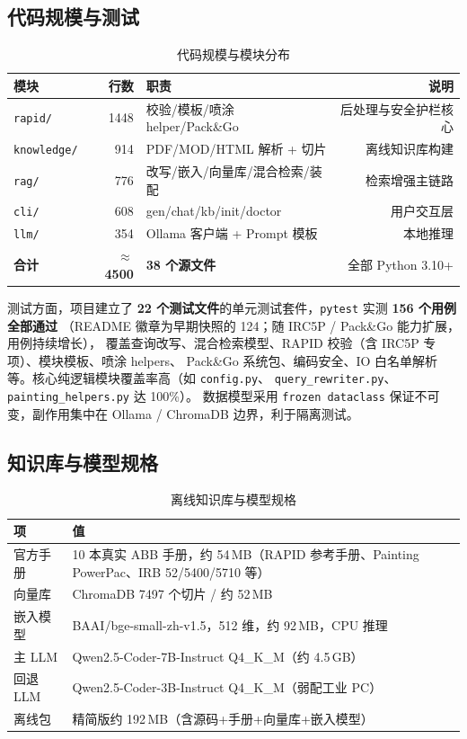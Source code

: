 \documentclass[12pt,a4paper,fontset=none]{ctexart}
\begin{document}
\subsection{代码规模与测试}
\begin{table}[h]
\centering
\caption{代码规模与模块分布}
\small
\begin{tabular}{@{}l r l r@{}}
\toprule
\textbf{模块} & \textbf{行数} & \textbf{职责} & \textbf{说明} \\
\midrule
\texttt{rapid/}     & 1448 & 校验/模板/喷涂 helper/Pack\&Go & 后处理与安全护栏核心 \\
\texttt{knowledge/} & 914  & PDF/MOD/HTML 解析 + 切片 & 离线知识库构建 \\
\texttt{rag/}       & 776  & 改写/嵌入/向量库/混合检索/装配 & 检索增强主链路 \\
\texttt{cli/}       & 608  & gen/chat/kb/init/doctor & 用户交互层 \\
\texttt{llm/}       & 354  & Ollama 客户端 + Prompt 模板 & 本地推理 \\
\midrule
\textbf{合计} & \textbf{$\approx$4500} & \textbf{38 个源文件} & 全部 Python 3.10+ \\
\bottomrule
\end{tabular}
\end{table}

测试方面，项目建立了 \textbf{22 个测试文件}的单元测试套件，\texttt{pytest} 实测 \textbf{156 个用例全部通过}
（README 徽章为早期快照的 124；随 IRC5P / Pack\&Go 能力扩展，用例持续增长），
覆盖查询改写、混合检索模型、RAPID 校验（含 IRC5P 专项）、模块模板、喷涂 helpers、
Pack\&Go 系统包、编码安全、IO 白名单解析等。核心纯逻辑模块覆盖率高（如 \texttt{config.py}、
\texttt{query\_rewriter.py}、\texttt{painting\_helpers.py} 达 100\%）。
数据模型采用 \texttt{frozen dataclass} 保证不可变，副作用集中在
Ollama / ChromaDB 边界，利于隔离测试。

\subsection{知识库与模型规格}
\begin{table}[h]
\centering
\caption{离线知识库与模型规格}
\small
\begin{tabularx}{\textwidth}{@{}l X@{}}
\toprule
\textbf{项} & \textbf{值} \\
\midrule
官方手册       & 10 本真实 ABB 手册，约 54\,MB（RAPID 参考手册、Painting PowerPac、IRB 52/5400/5710 等）\\
向量库         & ChromaDB 7497 个切片 / 约 52\,MB \\
嵌入模型       & BAAI/bge-small-zh-v1.5，512 维，约 92\,MB，CPU 推理 \\
主 LLM         & Qwen2.5-Coder-7B-Instruct Q4\_K\_M（约 4.5\,GB）\\
回退 LLM       & Qwen2.5-Coder-3B-Instruct Q4\_K\_M（弱配工业 PC）\\
离线包         & 精简版约 192\,MB（含源码+手册+向量库+嵌入模型）\\
\bottomrule
\end{tabularx}
\end{table}
\end{document}
